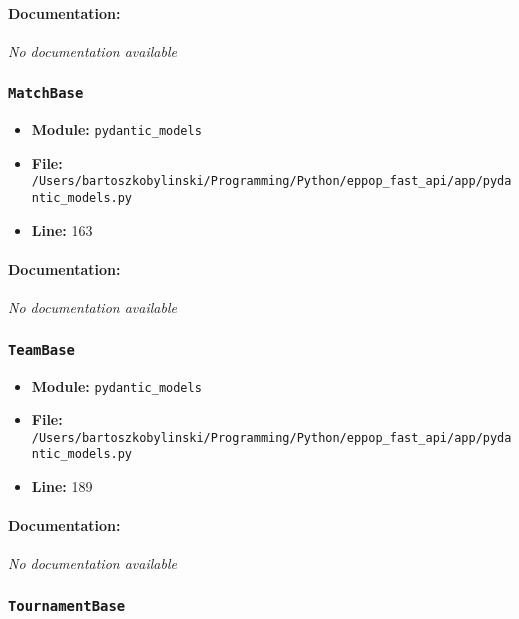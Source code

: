 \documentclass[11pt,a4paper]{article}
\begin{document}
\paragraph{Documentation:} \textit{No documentation available}


\vspace{1em}
\subsubsection{\texttt{MatchBase}}

\begin{itemize}
    \item \textbf{Module:} \texttt{pydantic\_models}
    \item \textbf{File:} \texttt{/Users/bartoszkobylinski/Programming/Python/eppop\_fast\_api/app/pydantic\_models.py}
    \item \textbf{Line:} 163
\end{itemize}

\paragraph{Documentation:} \textit{No documentation available}


\vspace{1em}
\subsubsection{\texttt{TeamBase}}

\begin{itemize}
    \item \textbf{Module:} \texttt{pydantic\_models}
    \item \textbf{File:} \texttt{/Users/bartoszkobylinski/Programming/Python/eppop\_fast\_api/app/pydantic\_models.py}
    \item \textbf{Line:} 189
\end{itemize}

\paragraph{Documentation:} \textit{No documentation available}


\vspace{1em}
\subsubsection{\texttt{TournamentBase}}
\end{document}
